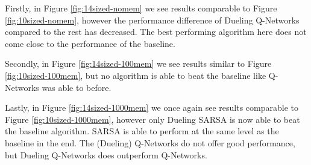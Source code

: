 Firstly, in Figure \ref{fig:14sized-nomem} we see results comparable to Figure \ref{fig:10sized-nomem}, however the performance difference of Dueling Q-Networks compared to the rest has decreased. The best performing algorithm here does not come close to the performance of the baseline.

Secondly, in Figure \ref{fig:14sized-100mem} we see results similar to Figure \ref{fig:10sized-100mem}, but no algorithm is able to beat the baseline like Q-Networks was able to before.

Lastly, in Figure \ref{fig:14sized-1000mem} we once again see results comparable to Figure \ref{fig:10sized-1000mem}, however only Dueling SARSA is now able to beat the baseline algorithm. SARSA is able to perform at the same level as the baseline in the end. The (Dueling) Q-Networks do not offer good performance, but Dueling Q-Networks does outperform Q-Networks.